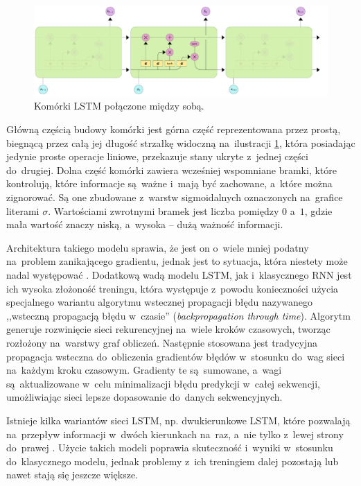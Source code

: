 \documentclass[data-science]{agh-wi} %
\begin{document}
\begin{figure}[ht!]
    \begin{center}
        \includegraphics[width=0.8\linewidth]{./img/new_lstm_chain.pdf}
    \end{center}
    \caption{Komórki LSTM połączone między sobą.}\label{fig:lstm_chain}
\end{figure}

Główną częścią budowy komórki jest górna część reprezentowana przez prostą, biegnącą przez całą jej długość strzałkę widoczną na~ilustracji \ref*{fig:lstm_chain}, która posiadając jedynie proste operacje liniowe, przekazuje stany ukryte z~jednej części do~drugiej. Dolna część komórki zawiera wcześniej wspomniane bramki, które kontrolują, które informacje są~ważne i~mają być zachowane, a~które można zignorować. Są one zbudowane z~warstw sigmoidalnych oznaczonych na~grafice literami $\sigma$. Wartościami zwrotnymi bramek jest liczba pomiędzy $0$ a~$1$, gdzie mała wartość znaczy niską, a~wysoka -- dużą ważność informacji.

Architektura takiego modelu sprawia, że jest on o~wiele mniej podatny na~problem zanikającego gradientu, jednak jest to sytuacja, która niestety może nadal występować \cite{vanishing_gradient}. Dodatkową wadą modelu LSTM, jak i~klasycznego RNN jest ich wysoka złożoność treningu, która występuje z~powodu konieczności użycia specjalnego wariantu algorytmu wstecznej propagacji błędu nazywanego ,,wsteczną propagacją błędu w~czasie'' (\textit{backpropagation through time}). Algorytm generuje rozwinięcie sieci rekurencyjnej na~wiele kroków czasowych, tworząc rozłożony na~warstwy graf obliczeń. Następnie stosowana jest tradycyjna propagacja wsteczna do~obliczenia gradientów błędów w~stosunku do~wag sieci na~każdym kroku czasowym. Gradienty te są~sumowane, a~wagi są~aktualizowane w~celu minimalizacji błędu predykcji w~całej sekwencji, umożliwiając sieci lepsze dopasowanie do~danych sekwencyjnych.

Istnieje kilka wariantów sieci LSTM, np. dwukierunkowe LSTM, które pozwalają na~przepływ informacji w~dwóch kierunkach na~raz, a~nie tylko z~lewej strony do~prawej \cite{bi_lstm}. Użycie takich modeli poprawia skuteczność i~wyniki w~stosunku do~klasycznego modelu, jednak problemy z~ich treningiem dalej pozostają lub nawet stają się jeszcze większe.
\end{document}
